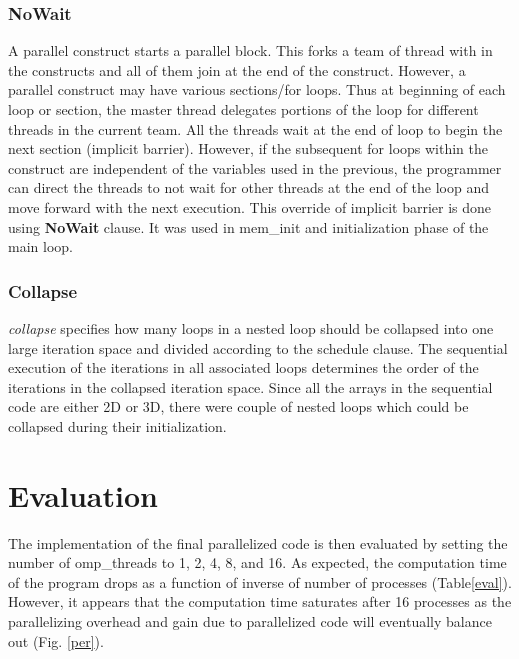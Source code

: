 \documentclass[a4paper, 10pt, conference]{IEEEtran}      %
\begin{document}
	\subsubsection{NoWait}
	A parallel construct starts a parallel block. This forks a team of thread with in the constructs and all of them join at the end of the construct. However, a parallel construct may have various sections/for loops. Thus at  beginning of each loop or section, the master thread  delegates portions of the loop for different threads in the current team. All the threads wait at the end of loop to begin the next section (implicit barrier). However, if the subsequent for loops within the construct are independent of the variables used in the previous, the programmer can direct the threads to not wait for other threads at the end of the loop and move forward with the next execution. This override of implicit barrier is done using \textbf{NoWait} clause.
	It was used in mem\_init and initialization phase of the main loop.\\
	
	\subsubsection{Collapse}
	\textit{collapse} specifies how many loops in a nested loop should be collapsed into one large iteration space and divided according to the schedule clause. The sequential execution of the iterations in all associated loops determines the order of the iterations in the collapsed iteration space. Since all the arrays in the sequential code are either 2D or 3D, there were couple of nested loops which could be collapsed during their initialization.\\
	
	
	\section{Evaluation} 

	The implementation of the final parallelized code is then evaluated by setting the number of omp\_threads to 1, 2, 4, 8, and 16. As expected, the computation time of the program drops as a function of inverse of number of processes (Table\ref{eval}). However, it appears that the computation time saturates after 16 processes as the parallelizing overhead and gain due to parallelized code will eventually balance out (Fig. \ref{per}). \\
	
\end{document}

